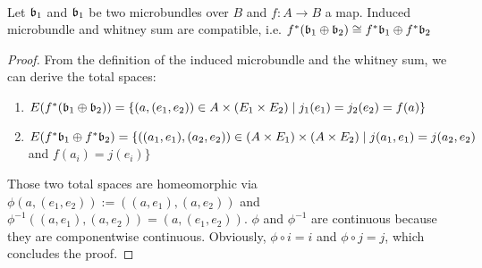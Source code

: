  \\
Let $\mathfrak{b}_1$ and $\mathfrak{b}_1$ be two microbundles over $B$ and $f: A \to B$ a map.
Induced microbundle and whitney sum are compatible, i.e. $f^*(\mathfrak{b}_1 \oplus \mathfrak{b}_2) \cong f^*\mathfrak{b}_1 \oplus f^*\mathfrak{b}_2$
\begin{proof}
From the definition of the induced microbundle and the whitney sum, we can derive the total spaces:
\begin{enumerate}
    \item $E(f^*(\mathfrak{b}_1 \oplus \mathfrak{b}_2)) = \{(a, (e_1, e_2)) \in A \times (E_1 \times E_2) \mid j_1(e_1) = j_2(e_2) = f(a) \}$
    \item $E(f^*\mathfrak{b}_1 \oplus f^*\mathfrak{b}_2) = \{((a_1, e_1), (a_2, e_2)) \in (A \times E_1) \times (A \times E_2) \mid j(a_1, e_1) = j(a_2, e_2)$ and $f(a_i) = j(e_i)\}$
\end{enumerate}
Those two total spaces are homeomorphic via $\phi(a, (e_1, e_2)) := ((a, e_1), (a, e_2))$ and
$\phi^{-1}((a, e_1), (a, e_2)) = (a, (e_1, e_2))$. $\phi$ and $\phi^{-1}$ are continuous because they are componentwise continuous.
Obviously, $\phi \circ i = i$ and $\phi \circ j = j$, which concludes the proof. 
\end{proof}